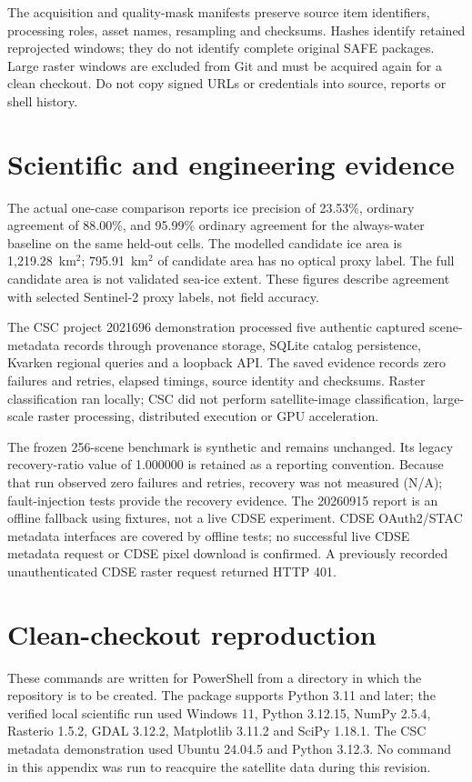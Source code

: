 The acquisition and quality-mask manifests preserve source item identifiers, processing
roles, asset names, resampling and checksums. Hashes identify retained reprojected windows;
they do not identify complete original SAFE packages. Large raster windows are excluded from
Git and must be acquired again for a clean checkout. Do not copy signed URLs or credentials
into source, reports or shell history.

\section{Scientific and engineering evidence}

The actual one-case comparison reports ice precision of 23.53\%, ordinary agreement of
88.00\%, and 95.99\% ordinary agreement for the always-water baseline on the same held-out
cells. The modelled candidate ice area is 1,219.28~km$^2$; 795.91~km$^2$ of candidate area
has no optical proxy label. The full candidate area is not validated sea-ice extent. These
figures describe agreement with selected Sentinel-2 proxy labels, not field accuracy.

The CSC project 2021696 demonstration processed five authentic captured scene-metadata
records through provenance storage, SQLite catalog persistence, Kvarken regional queries
and a loopback API. The saved evidence records zero failures and retries, elapsed timings,
source identity and checksums. Raster classification ran locally; CSC did not perform
satellite-image classification, large-scale raster processing, distributed execution or
GPU acceleration.

The frozen 256-scene benchmark is synthetic and remains unchanged. Its legacy recovery-ratio
value of 1.000000 is retained as a reporting convention. Because that run observed zero
failures and retries, recovery was not measured (N/A); fault-injection tests provide the
recovery evidence. The 20260915 report is an offline fallback using fixtures, not a live
CDSE experiment. CDSE OAuth2/STAC metadata interfaces are covered by offline tests; no
successful live CDSE metadata request or CDSE pixel download is confirmed. A previously
recorded unauthenticated CDSE raster request returned HTTP 401.

\section{Clean-checkout reproduction}

These commands are written for PowerShell from a directory in which the repository is to be
created. The package supports Python 3.11 and later; the verified local scientific run used
Windows 11, Python 3.12.15, NumPy 2.5.4, Rasterio 1.5.2, GDAL 3.12.2, Matplotlib 3.11.2
and SciPy 1.18.1. The CSC metadata demonstration used Ubuntu 24.04.5 and Python 3.12.3.
No command in this appendix was run to reacquire the satellite data during this revision.

